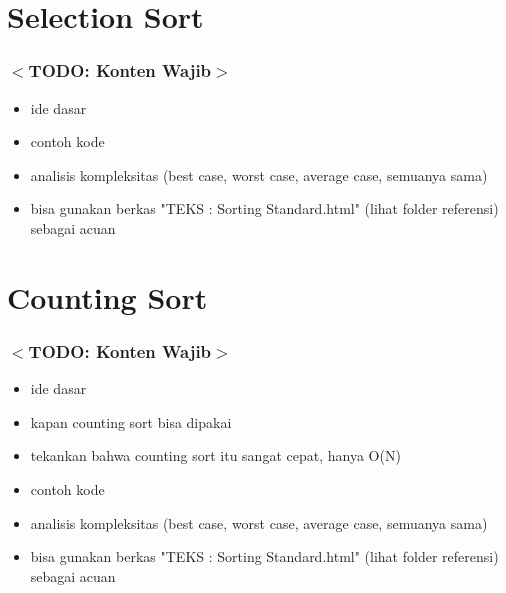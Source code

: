 \documentclass{beamer}
\begin{document}
\section{Selection Sort}
\frame{\sectionpage}

\begin{frame}
\frametitle{$<$TODO: Konten Wajib$>$}
\begin{itemize}
	\item ide dasar
	\item contoh kode
	\item analisis kompleksitas (best case, worst case, average case, semuanya sama)
	\item bisa gunakan berkas "TEKS : Sorting Standard.html" (lihat folder referensi) sebagai acuan
\end{itemize}
\end{frame}

\section{Counting Sort}
\frame{\sectionpage}

\begin{frame}
\frametitle{$<$TODO: Konten Wajib$>$}
\begin{itemize}
	\item ide dasar
	\item kapan counting sort bisa dipakai
	\item tekankan bahwa counting sort itu sangat cepat, hanya O(N)
	\item contoh kode
	\item analisis kompleksitas (best case, worst case, average case, semuanya sama)
	\item bisa gunakan berkas "TEKS : Sorting Standard.html" (lihat folder referensi) sebagai acuan
\end{itemize}
\end{frame}
\end{document}
